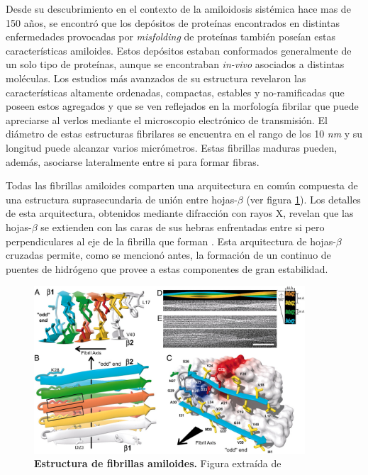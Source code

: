 Desde su descubrimiento en el contexto de la amiloidosis sistémica hace mas de 150 años, se encontró que los depósitos de proteínas encontrados en distintas enfermedades 
provocadas por \textit{misfolding} de proteínas también poseían estas características amiloides.
Estos depósitos estaban conformados generalmente de un solo tipo de proteínas, aunque se encontraban \textit{in-vivo} asociados a distintas moléculas.
Los estudios más avanzados de su estructura revelaron las características altamente ordenadas, compactas, estables y no-ramificadas que poseen estos agregados y que se ven reflejados en
la morfología fibrilar que puede apreciarse al verlos mediante el microscopio electrónico de transmisión.
El diámetro de estas estructuras fibrilares se encuentra en el rango de los 10 \textit{nm} y su longitud puede alcanzar varios micrómetros. 
Estas fibrillas maduras pueden, además, asociarse lateralmente entre si para formar fibras.

Todas las fibrillas amiloides comparten una arquitectura en común compuesta de una estructura suprasecundaria de unión entre hojas-$\beta$ (ver figura \ref{amyloidStructure}).
Los detalles de esta arquitectura, obtenidos mediante difracción con rayos X, revelan que 
las hojas-$\beta$ se extienden con las caras de sus hebras enfrentadas entre si pero perpendiculares al eje de la fibrilla que forman \cite{nelson2005structure}.  
Esta arquitectura de hojas-$\beta$ cruzadas permite, como se mencionó antes, la formación de un continuo de puentes de hidrógeno que provee a estas componentes de gran estabilidad. 



\begin{figure}[ht]
\centering
\includegraphics[width=0.9\textwidth]{img/amyloidStructure.jpg} 
\caption{\textbf{Estructura de fibrillas amiloides.} Figura extraída de \cite{luhrs20053d}}
\label{amyloidStructure}
\end{figure}



